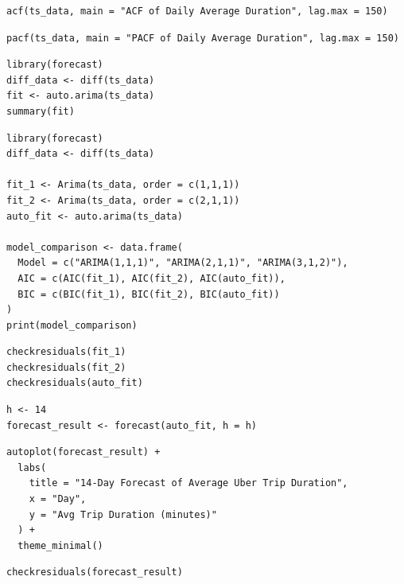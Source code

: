 \documentclass{article}
\begin{document}
\begin{lstlisting}[style=rstyle, caption={ ACF Plot}, label={lst:r_acf}]
acf(ts_data, main = "ACF of Daily Average Duration", lag.max = 150)
\end{lstlisting}

\begin{lstlisting}[style=rstyle, caption={ PACF Plot}, label={lst:r_pacf}]
pacf(ts_data, main = "PACF of Daily Average Duration", lag.max = 150)
\end{lstlisting}

\begin{lstlisting}[style=rstyle, caption={ ARIMA Model}, label={lst:r_arima}]
library(forecast)
diff_data <- diff(ts_data)
fit <- auto.arima(ts_data)
summary(fit)
\end{lstlisting}

\begin{lstlisting}[style=rstyle, caption={ Model Selection and Diagnostics}, label={lst:r_arima_model}]
library(forecast)
diff_data <- diff(ts_data)

fit_1 <- Arima(ts_data, order = c(1,1,1))
fit_2 <- Arima(ts_data, order = c(2,1,1))
auto_fit <- auto.arima(ts_data)

model_comparison <- data.frame(
  Model = c("ARIMA(1,1,1)", "ARIMA(2,1,1)", "ARIMA(3,1,2)"),
  AIC = c(AIC(fit_1), AIC(fit_2), AIC(auto_fit)),
  BIC = c(BIC(fit_1), BIC(fit_2), BIC(auto_fit))
)
print(model_comparison)
\end{lstlisting}

\begin{lstlisting}[style=rstyle, caption={ Model Selection and Diagnostics}, label={lst:r_arima_resid}]
checkresiduals(fit_1)
checkresiduals(fit_2)
checkresiduals(auto_fit)
\end{lstlisting}

\begin{lstlisting}[style=rstyle, caption={ 14-day Forecast}, label={lst:r_forecast}]
h <- 14
forecast_result <- forecast(auto_fit, h = h)
\end{lstlisting}

\begin{lstlisting}[style=rstyle, caption={ Plot of 14-day Forecast}, label={lst:r_forecast_plot}]
autoplot(forecast_result) +
  labs(
    title = "14-Day Forecast of Average Uber Trip Duration",
    x = "Day",
    y = "Avg Trip Duration (minutes)"
  ) +
  theme_minimal()
\end{lstlisting}

\begin{lstlisting}[style=rstyle, caption={ 14-day Forecast Residuals}, label={lst:r_forecast_resid}]
checkresiduals(forecast_result)
\end{lstlisting}
\end{document}

